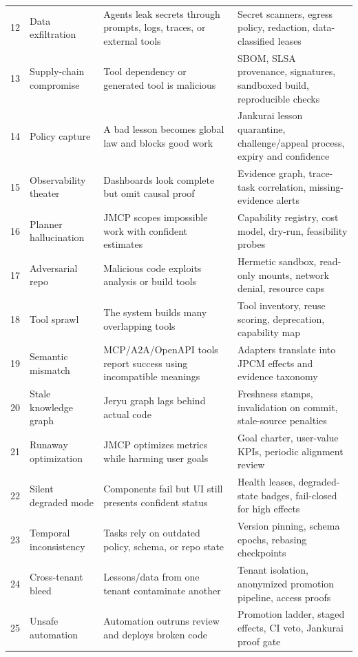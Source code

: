 \documentclass[10pt,journal,onecolumn]{IEEEtran}
\begin{document}
\begin{longtable}{P{0.04\textwidth} P{0.18\textwidth} P{0.35\textwidth} P{0.35\textwidth}}
12 & Data exfiltration & Agents leak secrets through prompts, logs, traces, or external tools & Secret scanners, egress policy, redaction, data-classified leases \\
13 & Supply-chain compromise & Tool dependency or generated tool is malicious & SBOM, SLSA provenance, signatures, sandboxed build, reproducible checks \\
14 & Policy capture & A bad lesson becomes global law and blocks good work & Jankurai lesson quarantine, challenge/appeal process, expiry and confidence \\
15 & Observability theater & Dashboards look complete but omit causal proof & Evidence graph, trace-task correlation, missing-evidence alerts \\
16 & Planner hallucination & JMCP scopes impossible work with confident estimates & Capability registry, cost model, dry-run, feasibility probes \\
17 & Adversarial repo & Malicious code exploits analysis or build tools & Hermetic sandbox, read-only mounts, network denial, resource caps \\
18 & Tool sprawl & The system builds many overlapping tools & Tool inventory, reuse scoring, deprecation, capability map \\
19 & Semantic mismatch & MCP/A2A/OpenAPI tools report success using incompatible meanings & Adapters translate into JPCM effects and evidence taxonomy \\
20 & Stale knowledge graph & Jeryu graph lags behind actual code & Freshness stamps, invalidation on commit, stale-source penalties \\
21 & Runaway optimization & JMCP optimizes metrics while harming user goals & Goal charter, user-value KPIs, periodic alignment review \\
22 & Silent degraded mode & Components fail but UI still presents confident status & Health leases, degraded-state badges, fail-closed for high effects \\
23 & Temporal inconsistency & Tasks rely on outdated policy, schema, or repo state & Version pinning, schema epochs, rebasing checkpoints \\
24 & Cross-tenant bleed & Lessons/data from one tenant contaminate another & Tenant isolation, anonymized promotion pipeline, access proofs \\
25 & Unsafe automation & Automation outruns review and deploys broken code & Promotion ladder, staged effects, CI veto, Jankurai proof gate \\

\end{longtable}
\end{document}

